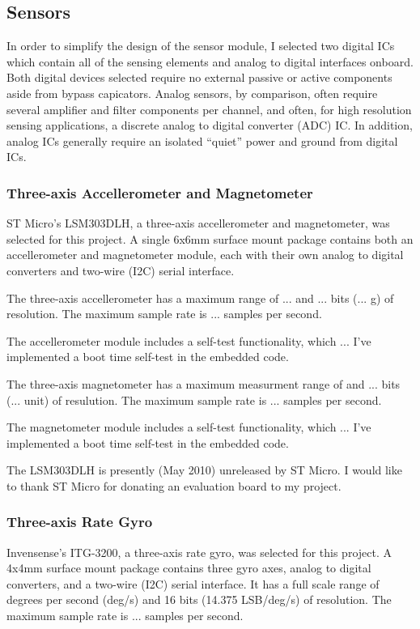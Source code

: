 \documentclass[12pt]{report}
\begin{document}
\subsection{Sensors}
In order to simplify the design of the sensor module, I selected two digital ICs which contain all of the sensing elements and analog to digital interfaces onboard. 
Both digital devices selected require no external passive or active components aside from bypass capicators. Analog sensors, by comparison, often require several amplifier and filter components per channel, and often, for high resolution sensing applications, a discrete analog to digital converter (ADC) IC. In addition, analog ICs generally require an isolated ``quiet'' power and ground from digital ICs. 

\subsubsection{Three-axis Accellerometer and Magnetometer}
ST Micro's LSM303DLH, a three-axis accellerometer and magnetometer, was selected for this project. A single 6x6mm surface mount package contains both an accellerometer and magnetometer module, each with their own analog to digital converters and two-wire (I2C) serial interface. 

The three-axis accellerometer has a maximum range of ... and ... bits (... g) of resolution. The maximum sample rate is ... samples per second.

The accellerometer module includes a self-test functionality, which ...
I've implemented a boot time self-test in the embedded code.

The three-axis magnetometer has a maximum measurment range of  and ... bits (... unit) of resulution. The maximum sample rate is ... samples per second. 

The magnetometer module includes a self-test functionality, which ...
I've implemented a boot time self-test in the embedded code.

The LSM303DLH is presently (May 2010) unreleased by ST Micro. I would like to thank ST Micro for donating an evaluation board to my project.

\subsubsection{Three-axis Rate Gyro}

Invensense's ITG-3200, a three-axis rate gyro, was selected for this project. A 4x4mm surface mount package contains three gyro axes, analog to digital converters, and a two-wire (I2C) serial interface. It has a full scale range of  degrees per second (deg/s) and 16 bits (14.375 LSB/deg/s) of resolution. The maximum sample rate is ... samples per second.
\end{document}
